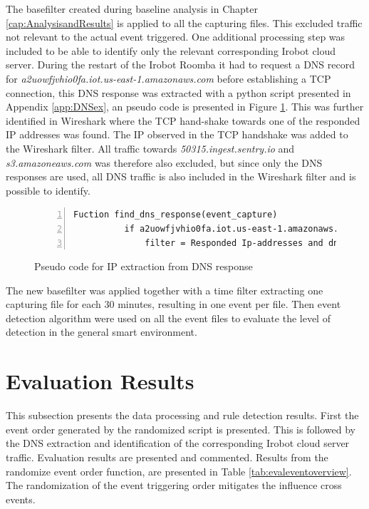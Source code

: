 The basefilter created during baseline analysis in Chapter \ref{cap:AnalysisandResults} is applied to all the capturing files. This excluded traffic not relevant to the actual event triggered. One additional processing step was included to be able to identify only the relevant corresponding Irobot cloud server. During the restart of the Irobot Roomba it had to request a \gls{DNS} record for \textit{a2uowfjvhio0fa.iot.us-east-1.amazonaws.com} before establishing a \gls{TCP} connection, this \gls{DNS} response was extracted with a python script presented in Appendix \ref{app:DNSex}, an pseudo code is presented in Figure \ref{fig:Sudo_code_for_IP_extraction_from_DNS_response}. This was further identified in Wireshark where the \gls{TCP} hand-shake towards one of the responded \gls{IP} addresses was found. The \gls{IP} observed in the \gls{TCP} handshake was added to the Wireshark filter. All traffic towards \textit{50315.ingest.sentry.io} and \textit{s3.amazoneaws.com} was therefore also excluded, but since only the \gls{DNS} responses are used, all \gls{DNS} traffic is also included in the Wireshark filter and is possible to identify.  

\begin{figure}[H]
    \centering
    \caption{Pseudo code for \gls{IP} extraction from \gls{DNS} response}
    \label{fig:Sudo_code_for_IP_extraction_from_DNS_response}
    \begin{lstlisting}[numbers=left]
        Fuction find_dns_response(event_capture)
          if a2uowfjvhio0fa.iot.us-east-1.amazonaws.com in event_capture
              filter = Responded Ip-addresses and dns
    \end{lstlisting}
 \end{figure}   
 
The new basefilter was applied together with a time filter extracting one capturing file for each 30 minutes, resulting in one event per file. Then event detection algorithm were used on all the event files to evaluate the level of detection in the general smart environment.  

\section{Evaluation Results}

This subsection presents the data processing and rule detection results. First the event order generated by the randomized script is presented. This is followed by the \gls{DNS} extraction and identification of the corresponding Irobot cloud server traffic. Evaluation results are presented and commented. 
Results from the randomize event order function, are presented in Table \ref{tab:evaleventoverview}. The randomization of the event triggering order mitigates the influence cross events. 

